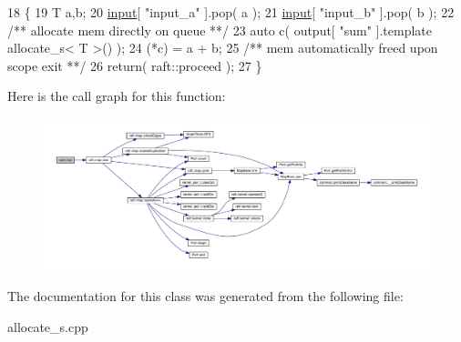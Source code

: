 \begin{DoxyCode}
18    \{
19       T a,b; 
20       \hyperlink{classraft_1_1kernel_a6edbe35a56409d402e719b3ac36d6554}{input}[ \textcolor{stringliteral}{"input\_a"} ].pop( a );
21       \hyperlink{classraft_1_1kernel_a6edbe35a56409d402e719b3ac36d6554}{input}[ \textcolor{stringliteral}{"input\_b"} ].pop( b );\textcolor{comment}{}
22 \textcolor{comment}{      /** allocate mem directly on queue **/}
23       \textcolor{keyword}{auto} c( output[ \textcolor{stringliteral}{"sum"} ].\textcolor{keyword}{template} allocate\_s< T >() );
24       (*c) = a + b;\textcolor{comment}{}
25 \textcolor{comment}{      /** mem automatically freed upon scope exit **/}
26       \textcolor{keywordflow}{return}( raft::proceed );
27    \}
\end{DoxyCode}
Here is the call graph for this function\+:
\nopagebreak
\begin{figure}[H]
\begin{center}
\leavevmode
\includegraphics[width=350pt]{classsum_a2d0fac9129b826678d00520621937b15_cgraph}
\end{center}
\end{figure}


The documentation for this class was generated from the following file\+:\begin{DoxyCompactItemize}
\item 
allocate\+\_\+s.\+cpp\end{DoxyCompactItemize}
